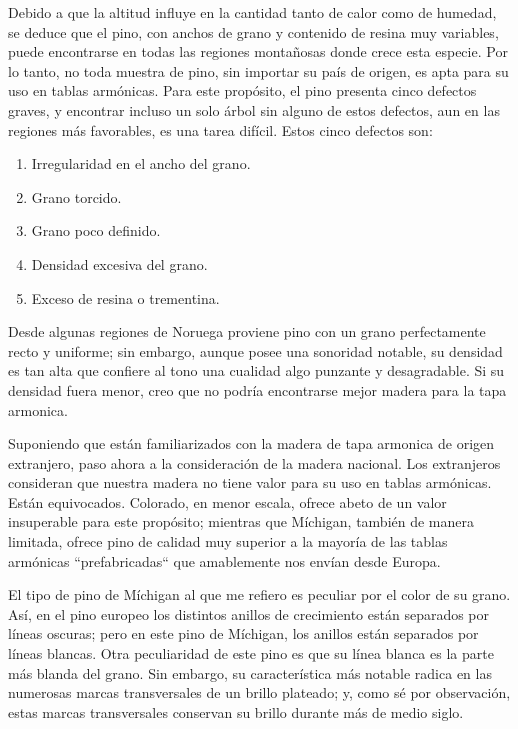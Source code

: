 \documentclass[12pt]{book}
\begin{document}
Debido a que la altitud influye en la cantidad tanto de calor como de humedad, se deduce que el pino, con anchos de grano y contenido de resina muy variables, puede encontrarse en todas las regiones montañosas donde crece esta especie. Por lo tanto, no toda muestra de pino, sin importar su país de origen, es apta para su uso en tablas armónicas. Para este propósito, el pino presenta cinco defectos graves, y encontrar incluso un solo árbol sin alguno de estos defectos, aun en las regiones más favorables, es una tarea difícil. Estos cinco defectos son:

\begin{enumerate}
    \item Irregularidad en el ancho del grano.
    \item Grano torcido.
    \item Grano poco definido.
    \item Densidad excesiva del grano.
    \item Exceso de resina o trementina.
\end{enumerate}

Desde algunas regiones de Noruega proviene pino con un grano perfectamente recto y uniforme; sin embargo, aunque posee una sonoridad notable, su densidad es tan alta que confiere al tono una cualidad algo punzante y desagradable. Si su densidad fuera menor, creo que no podría encontrarse mejor madera para la tapa armonica.

Suponiendo que están familiarizados con la madera de tapa armonica de origen extranjero, paso ahora a la consideración de la madera nacional. Los extranjeros consideran que nuestra madera no tiene valor para su uso en tablas armónicas. Están equivocados. Colorado, en menor escala, ofrece abeto de un valor insuperable para este propósito; mientras que Míchigan, también de manera limitada, ofrece pino de calidad muy superior a la mayoría de las tablas armónicas ``prefabricadas`` que amablemente nos envían desde Europa. 

El tipo de pino de Míchigan al que me refiero es peculiar por el color de su grano. Así, en el pino europeo los distintos anillos de crecimiento están separados por líneas oscuras; pero en este pino de Míchigan, los anillos están separados por líneas blancas. Otra peculiaridad de este pino es que su línea blanca es la parte más blanda del grano. Sin embargo, su característica más notable radica en las numerosas marcas transversales de un brillo plateado; y, como sé por observación, estas marcas transversales conservan su brillo durante más de medio siglo.
\end{document}
